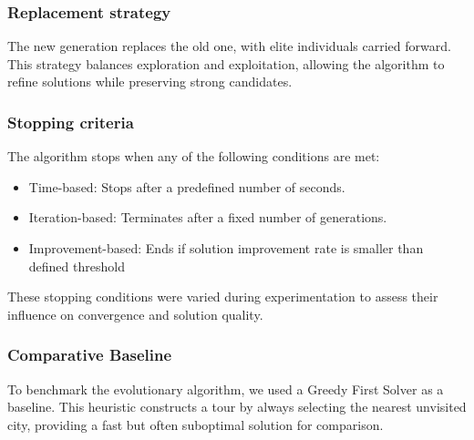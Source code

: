 \documentclass{scrartcl}
\begin{document}
\subsubsection{Replacement strategy}
The new generation replaces the old one, with elite individuals carried forward. This strategy balances exploration and exploitation, allowing the algorithm to refine solutions while preserving strong candidates.
\subsubsection{Stopping criteria}
The algorithm stops when any of the following conditions are met:
\begin{itemize}
  \item Time-based: Stops after a predefined number of seconds.
  \item Iteration-based: Terminates after a fixed number of generations.
  \item Improvement-based: Ends if solution improvement rate is smaller than defined threshold
\end{itemize}
These stopping conditions were varied during experimentation to assess their influence on convergence and solution quality.

\subsubsection{Comparative Baseline}
To benchmark the evolutionary algorithm, we used a Greedy First Solver as a baseline. This heuristic constructs a tour by always selecting the nearest unvisited city, providing a fast but often suboptimal solution for comparison.
\end{document}
